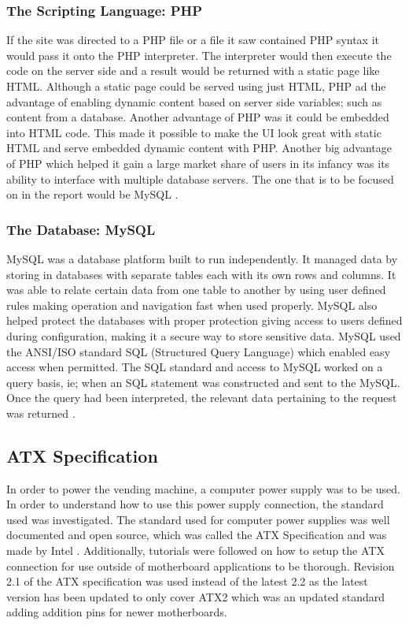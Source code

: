 \documentclass[a4paper,11pt]{article}
\numberwithin{figure}{section}
\numberwithin{table}{section}
\begin{document}
\subsubsection{The Scripting Language: PHP}
If the site was directed to a PHP file or a file it saw contained PHP syntax it would pass it onto the PHP interpreter. The interpreter would then execute the code on the server side and a result would be returned with a static page like HTML. Although a static page could be served using just HTML, PHP ad the advantage of enabling dynamic content based on server side variables; such as content from a database. Another advantage of PHP was it could be embedded into HTML code. This made it possible to make the UI look great with static HTML and serve embedded dynamic content with PHP. Another big advantage of PHP which helped it gain a large market share of users in its infancy was its ability to interface with multiple database servers. The one that is to be focused on in the report would be MySQL \cite{PHP}.


\subsubsection{The Database: MySQL}
MySQL was a database platform built to run independently. It managed data by storing in databases with separate tables each with its own rows and columns. It was able to relate certain data from one table to another by using user defined rules making operation and navigation fast when used properly. MySQL also helped protect the databases with proper protection giving access to users defined during configuration, making it a secure way to store sensitive data. MySQL used the ANSI/ISO standard SQL (Structured Query Language) which enabled easy access when permitted. The SQL standard and access to MySQL worked on a query basis, ie; when an SQL statement was constructed and sent to the MySQL. Once the query had been interpreted, the relevant data pertaining to the request was returned \cite{mysql}.  

\subsection{ATX Specification}
In order to power the vending machine, a computer power supply was to be used. In order to understand how to use this power supply connection, the standard used was investigated. The standard used for computer power supplies was well documented and open source, which was called the ATX Specification and was made by Intel \cite{ATX}. Additionally, tutorials were followed on how to setup the ATX connection for use outside of motherboard applications to be thorough. Revision 2.1 of the ATX specification was used instead of the latest 2.2 as the latest version has been updated to only cover ATX2 which was an updated standard adding addition pins for newer motherboards.
\end{document}
